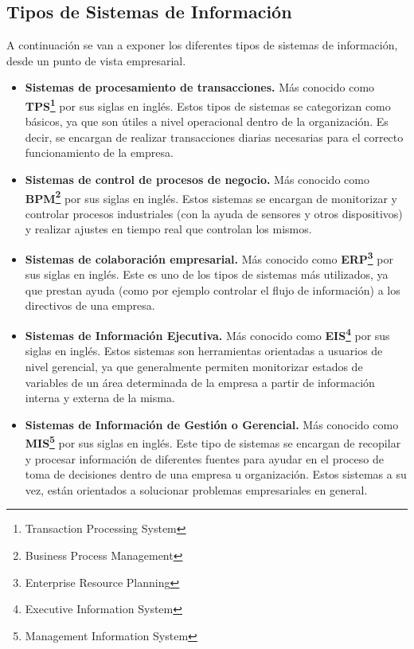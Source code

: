 \subsection{Tipos de Sistemas de Información}

A continuación se van a exponer los diferentes tipos de sistemas de información, desde un punto de vista empresarial.

\begin{itemize}

\item \textbf{Sistemas de procesamiento de transacciones.} Más conocido como \textbf{TPS\footnote{Transaction Processing System}} por sus siglas en inglés. Estos tipos de sistemas se categorizan como básicos, ya que son útiles a nivel operacional dentro de la organización. Es decir, se encargan de realizar transacciones diarias necesarias para el correcto funcionamiento de la empresa\cite{tipos}.
\item \textbf{Sistemas de control de procesos de negocio.} Más conocido como \textbf{BPM\footnote{Business Process Management}} por sus siglas en inglés. Estos sistemas se encargan de monitorizar y controlar procesos industriales (con la ayuda de sensores y otros dispositivos) y realizar ajustes en tiempo real que controlan los mismos.
\item \textbf{Sistemas de colaboración empresarial.} Más conocido como \textbf{ERP\footnote{Enterprise Resource Planning}} por sus siglas en inglés. Este es uno de los tipos de sistemas más utilizados, ya que prestan ayuda (como por ejemplo controlar el flujo de información) a los directivos de una empresa.
\item \textbf{Sistemas de Información Ejecutiva.} Más conocido como \textbf{EIS\footnote{Executive Information System}} por sus siglas en inglés. Estos sistemas son herramientas orientadas a usuarios de nivel gerencial, ya que generalmente permiten monitorizar estados de variables de un área determinada de la empresa a partir de información interna y externa de la misma\cite{ejecutiva}.
\item \textbf{Sistemas de Información de Gestión o Gerencial.} Más conocido como \textbf{MIS\footnote{Management Information System}} por sus siglas en inglés. Este tipo de sistemas se encargan de recopilar y procesar información de diferentes fuentes para ayudar en el proceso de toma de decisiones dentro de una empresa u organización. Estos sistemas a su vez, están orientados a solucionar problemas empresariales en general.
\end{itemize}


